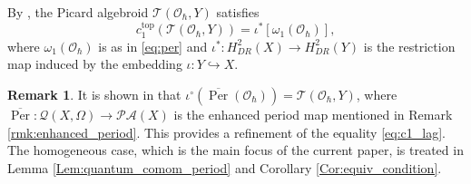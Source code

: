 \documentclass[12pt]{amsart}
\newcommand{\TT}{\mathscr{T}}
\newcommand{\tat}{\TT(\Q,Y)}
\newcommand{\pic}{\mathscr{PA}}
\newcommand{\quan}{\mathcal{Q}}
\newcommand{\per}{\operatorname{Per}}
\newcommand{\OO}{\mathcal{O}}
\newcommand{\Q}{\OO_\hbar}
\theoremstyle{definition}
\newtheorem{Rem}[Thm]{Remark}
\numberwithin{equation}{section}
\begin{document}
By \cite[\S\,5.3]{BGKP}, the Picard algebroid $\tat$ satisfies
\begin{equation}  \label{eq:c1_lag}
	c^{\operatorname{top}}_1(\tat)=\iota^*[\omega_1(\OO_\hbar)],
\end{equation}
where $\omega_1(\OO_\hbar)$ is as in \eqref{eq:per} and $\iota^*: H^2_{DR}(X) \to H^2_{DR}(Y)$ is the restriction map induced by the embedding $\iota: Y \hookrightarrow X$.

\begin{Rem} \label{rmk:enhanced_period_lag}
	It is shown in \cite[Proposition 6.4]{Yu} that $\iota^\circ\left(\overline{\per}(\OO_\hbar)\right) = \tat$, where $\overline{\per}: \quan(X, \Omega) \to \pic(X)$ is the enhanced period map mentioned in Remark \ref{rmk:enhanced_period}. This provides a refinement of the equality \eqref{eq:c1_lag}. The homogeneous case, which is the main focus of the current paper, is treated in Lemma \ref{Lem:quantum_comom_period} and Corollary \ref{Cor:equiv_condition}.
\end{Rem}
\end{document}

